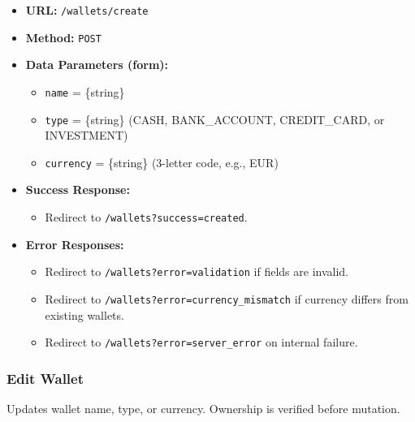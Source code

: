 \begin{itemize}
    \item \textbf{URL:} \texttt{/wallets/create}
    \item \textbf{Method:} \texttt{POST}
    \item \textbf{Data Parameters (form):}
    \begin{itemize}
        \item \texttt{name} = \{string\}
        \item \texttt{type} = \{string\} (CASH, BANK\_ACCOUNT, CREDIT\_CARD, or INVESTMENT)
        \item \texttt{currency} = \{string\} (3-letter code, e.g., EUR)
    \end{itemize}
    \item \textbf{Success Response:}
    \begin{itemize}
        \item Redirect to \texttt{/wallets?success=created}.
    \end{itemize}
    \item \textbf{Error Responses:}
    \begin{itemize}
        \item Redirect to \texttt{/wallets?error=validation} if fields are invalid.
        \item Redirect to \texttt{/wallets?error=currency\_mismatch} if currency differs from existing wallets.
        \item Redirect to \texttt{/wallets?error=server\_error} on internal failure.
    \end{itemize}
\end{itemize}

\subsubsection{Edit Wallet}

Updates wallet name, type, or currency. Ownership is verified before mutation.

